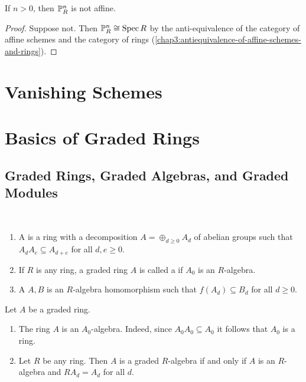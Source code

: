\begin{corollary}
	If $n > 0$, then $\mathbb P^n_R$ is not affine.
\end{corollary} 
\begin{proof}
	Suppose not. Then $\mathbb P^n_R \cong \operatorname{Spec} R$ by the anti-equivalence of the category of affine schemes and the category of rings (\cref{chap3:antiequivalence-of-affine-schemes-and-rings}).
\end{proof}

\section{Vanishing Schemes}





\section{Basics of Graded Rings}
\subsection*{Graded Rings, Graded Algebras, and Graded Modules}

\begin{definition}~
	\begin{enumerate}
		\item A  is a ring with a decomposition $A = \oplus_{d \geq 0} A_d$ of abelian groups such that $A_d A_e \subseteq A_{d + e}$ for all $d, e\geq 0$.
		
		\item If $R$ is any ring, a graded ring $A$ is called a  if $A_0$ is an $R$-algebra.
		
		\item A  $A, B$ is an $R$-algebra homomorphism such that $f(A_d) \subseteq B_d$ for all $d \geq 0$.
	\end{enumerate}
\end{definition}

\begin{remark}
	Let $A$ be a graded ring.
	\begin{enumerate}
		\item The ring $A$ is an $A_0$-algebra. Indeed, since $A_0A_0 \subseteq A_0$ it follows that $A_0$ is a ring.
		
		\item Let $R$ be any ring. Then $A$ is a graded $R$-algebra if and only if $A$ is an $R$-algebra and $RA_d = A_d$ for all $d$.
	\end{enumerate}
\end{remark}


